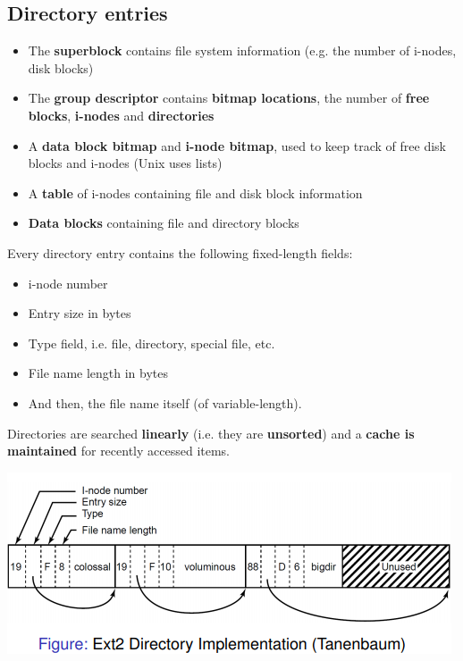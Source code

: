 \documentclass{article}
\begin{document}
\pagebreak
\subsection{Directory entries}
\begin{itemize}
	\item The \textbf{superblock} contains file system information (e.g. the number of i-nodes, disk blocks)
	\item The \textbf{group descriptor} contains \textbf{bitmap locations}, the number of \textbf{free blocks}, \textbf{i-nodes} and \textbf{directories}
	\item A \textbf{data block bitmap} and \textbf{i-node bitmap}, used to keep track of free disk blocks and i-nodes (Unix uses lists)
	\item A \textbf{table} of i-nodes containing file and disk block information
	\item \textbf{Data blocks} containing file and directory blocks
\end{itemize}
\begin{flushleft}
Every directory entry contains the following fixed-length fields:
\begin{itemize}
	\item i-node number
	\item Entry size in bytes
	\item Type field, i.e. file, directory, special file, etc.
	\item File name length in bytes
	\item And then, the file name itself (of variable-length).
\end{itemize}
Directories are searched \textbf{linearly} (i.e. they are \textbf{unsorted}) and a \textbf{cache is maintained} for recently accessed items.
\end{flushleft}
\begin{center}
	\includegraphics[scale=0.6]{directory_implementation.png}
\end{center}
\end{document}
